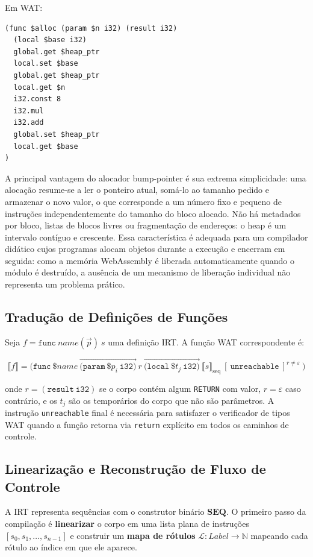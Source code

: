 Em WAT:

\begin{verbatim}
(func $alloc (param $n i32) (result i32)
  (local $base i32)
  global.get $heap_ptr
  local.set $base
  global.get $heap_ptr
  local.get $n
  i32.const 8
  i32.mul
  i32.add
  global.set $heap_ptr
  local.get $base
)
\end{verbatim}

A principal vantagem do alocador bump-pointer é sua extrema simplicidade: uma
alocação resume-se a ler o ponteiro atual, somá-lo ao tamanho pedido e
armazenar o novo valor, o que corresponde a um número fixo e pequeno de
instruções independentemente do tamanho do bloco alocado.  Não há metadados
por bloco, listas de blocos livres ou fragmentação de endereços: o heap é um
intervalo contíguo e crescente.  Essa característica é adequada para um
compilador didático cujos programas alocam objetos durante a execução e
encerram em seguida: como a memória WebAssembly é liberada automaticamente
quando o módulo é destruído, a ausência de um mecanismo de liberação
individual não representa um problema prático.

\subsection{Tradução de Definições de Funções}

Seja $f = \mathtt{func}\ \mathit{name}(\vec{p})\ s$ uma definição IRT.  A
função WAT correspondente é:

\[
  \llbracket f \rrbracket =
  \mathtt{(func}\ \$\mathit{name}\ \vec{\mathtt{(param}\ \$p_i\ \mathtt{i32)}}\ r\
    \vec{\mathtt{(local}\ \$t_j\ \mathtt{i32)}}\ \llbracket s
    \rrbracket_{\text{seq}}\
  [\ \mathtt{unreachable}\ ]^{r \neq \varepsilon}\ \mathtt{)}
\]

onde $r = \mathtt{(result\ i32)}$ se o corpo contém algum \texttt{RETURN} com
valor, $r = \varepsilon$ caso contrário, e os $t_j$ são os temporários do corpo
que não são parâmetros.  A instrução \texttt{unreachable} final é necessária
para satisfazer o verificador de tipos WAT quando a função retorna via
\texttt{return} explícito em todos os caminhos de controle.

\subsection{Linearização e Reconstrução de Fluxo de Controle}

A IRT representa sequências com o construtor binário $\mathbf{SEQ}$.  O
primeiro passo da compilação é \textbf{linearizar} o corpo em uma lista plana
de instruções $[s_0, s_1, \ldots, s_{n-1}]$ e construir um \textbf{mapa de
rótulos} $\mathcal{L} : \mathit{Label} \to \mathbb{N}$ mapeando cada rótulo ao
índice em que ele aparece.

